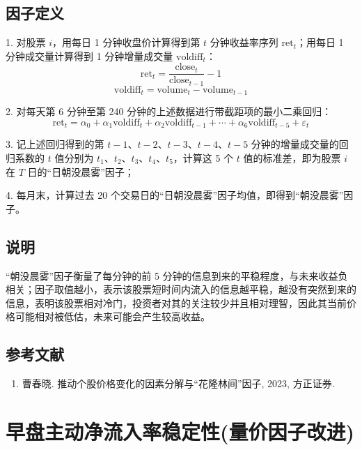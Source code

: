 \documentclass{article}
\begin{document}
\subsection{因子定义}

1. 对股票 \( i \)，用每日 1 分钟收盘价计算得到第 \( t \) 分钟收益率序列 \( \mathrm{ret}_t \)；用每日 1 分钟成交量计算得到 1 分钟增量成交量 \( \mathrm{voldiff}_t \)：
   \begin{equation}
       \mathrm{ret}_t = \frac{\mathrm{close}_t}{\mathrm{close}_{t-1}} - 1
   \end{equation}
   \begin{equation}
       \mathrm{voldiff}_t = \mathrm{volume}_t - \mathrm{volume}_{t-1}
   \end{equation}

2. 对每天第 6 分钟至第 240 分钟的上述数据进行带截距项的最小二乘回归：
   \begin{equation}
       \mathrm{ret}_t = \alpha_0 + \alpha_1 \mathrm{voldiff}_t + \alpha_2 \mathrm{voldiff}_{t-1} + \cdots + \alpha_6 \mathrm{voldiff}_{t-5} + \varepsilon_t
   \end{equation}

3. 记上述回归得到的第 \( t-1 \)、\( t-2 \)、\( t-3 \)、\( t-4 \)、\( t-5 \) 分钟的增量成交量的回归系数的 \( t \) 值分别为 \( t_1 \)、\( t_2 \)、\( t_3 \)、\( t_4 \)、\( t_5 \)，计算这 5 个 \( t \) 值的标准差，即为股票 \( i \) 在 \( T \) 日的“日朝没晨雾”因子；

4. 每月末，计算过去 20 个交易日的“日朝没晨雾”因子均值，即得到“朝没晨雾”因子。

\subsection{说明}
“朝没晨雾”因子衡量了每分钟的前 5 分钟的信息到来的平稳程度，与未来收益负相关；因子取值越小，表示该股票短时间内流入的信息越平稳，越没有突然到来的信息，表明该股票相对冷门，投资者对其的关注较少并且相对理智，因此其当前价格可能相对被低估，未来可能会产生较高收益。

\subsection{参考文献}
\begin{enumerate}
    \item 曹春晓. 推动个股价格变化的因素分解与“花隆林间”因子, 2023, 方正证券.
\end{enumerate}

\section{早盘主动净流入率稳定性(量价因子改进)}
\end{document}
